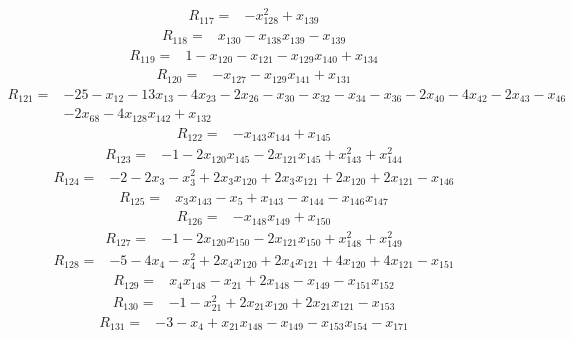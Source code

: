 \[\begin{aligned}R_{117}={}&-x_{128}^{2}+x_{139}
\end{aligned}\]
\[\begin{aligned}R_{118}={}&x_{130}-x_{138}x_{139}-x_{139}
\end{aligned}\]
\[\begin{aligned}R_{119}={}&1-x_{120}-x_{121}-x_{129}x_{140}+x_{134}
\end{aligned}\]
\[\begin{aligned}R_{120}={}&-x_{127}-x_{129}x_{141}+x_{131}
\end{aligned}\]
\[\begin{aligned}R_{121}={}&-25-x_{12}-13x_{13}-4x_{23}-2x_{26}-x_{30}-x_{32}-x_{34}-x_{36}-2x_{40}-4x_{42}-2x_{43}-x_{46}
\\&-2x_{68}-4x_{128}x_{142}+x_{132}
\end{aligned}\]
\[\begin{aligned}R_{122}={}&-x_{143}x_{144}+x_{145}
\end{aligned}\]
\[\begin{aligned}R_{123}={}&-1-2x_{120}x_{145}-2x_{121}x_{145}+x_{143}^{2}+x_{144}^{2}
\end{aligned}\]
\[\begin{aligned}R_{124}={}&-2-2x_{3}-x_{3}^{2}+2x_{3}x_{120}+2x_{3}x_{121}+2x_{120}+2x_{121}-x_{146}
\end{aligned}\]
\[\begin{aligned}R_{125}={}&x_{3}x_{143}-x_{5}+x_{143}-x_{144}-x_{146}x_{147}
\end{aligned}\]
\[\begin{aligned}R_{126}={}&-x_{148}x_{149}+x_{150}
\end{aligned}\]
\[\begin{aligned}R_{127}={}&-1-2x_{120}x_{150}-2x_{121}x_{150}+x_{148}^{2}+x_{149}^{2}
\end{aligned}\]
\[\begin{aligned}R_{128}={}&-5-4x_{4}-x_{4}^{2}+2x_{4}x_{120}+2x_{4}x_{121}+4x_{120}+4x_{121}-x_{151}
\end{aligned}\]
\[\begin{aligned}R_{129}={}&x_{4}x_{148}-x_{21}+2x_{148}-x_{149}-x_{151}x_{152}
\end{aligned}\]
\[\begin{aligned}R_{130}={}&-1-x_{21}^{2}+2x_{21}x_{120}+2x_{21}x_{121}-x_{153}
\end{aligned}\]
\[\begin{aligned}R_{131}={}&-3-x_{4}+x_{21}x_{148}-x_{149}-x_{153}x_{154}-x_{171}
\end{aligned}\]
